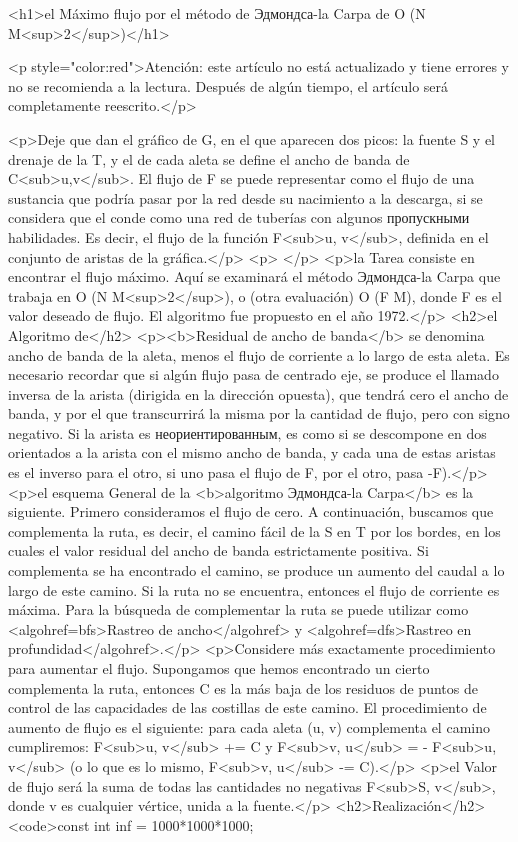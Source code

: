 <h1>el Máximo flujo por el método de Эдмондса-la Carpa de O (N M<sup>2</sup>)</h1>

<p style="color:red">Atención: este artículo no está actualizado y tiene errores y no se recomienda a la lectura. Después de algún tiempo, el artículo será completamente reescrito.</p>

<p>Deje que dan el gráfico de G, en el que aparecen dos picos: la fuente S y el drenaje de la T, y el de cada aleta se define el ancho de banda de C<sub>u,v</sub>. El flujo de F se puede representar como el flujo de una sustancia que podría pasar por la red desde su nacimiento a la descarga, si se considera que el conde como una red de tuberías con algunos пропускными habilidades. Es decir, el flujo de la función F<sub>u, v</sub>, definida en el conjunto de aristas de la gráfica.</p>
<p> </p>
<p>la Tarea consiste en encontrar el flujo máximo. Aquí se examinará el método Эдмондса-la Carpa que trabaja en O (N M<sup>2</sup>), o (otra evaluación) O (F M), donde F es el valor deseado de flujo. El algoritmo fue propuesto en el año 1972.</p>
<h2>el Algoritmo de</h2>
<p><b>Residual de ancho de banda</b> se denomina ancho de banda de la aleta, menos el flujo de corriente a lo largo de esta aleta. Es necesario recordar que si algún flujo pasa de centrado eje, se produce el llamado inversa de la arista (dirigida en la dirección opuesta), que tendrá cero el ancho de banda, y por el que transcurrirá la misma por la cantidad de flujo, pero con signo negativo. Si la arista es неориентированным, es como si se descompone en dos orientados a la arista con el mismo ancho de banda, y cada una de estas aristas es el inverso para el otro, si uno pasa el flujo de F, por el otro, pasa -F).</p>
<p>el esquema General de la <b>algoritmo Эдмондса-la Carpa</b> es la siguiente. Primero consideramos el flujo de cero. A continuación, buscamos que complementa la ruta, es decir, el camino fácil de la S en T por los bordes, en los cuales el valor residual del ancho de banda estrictamente positiva. Si complementa se ha encontrado el camino, se produce un aumento del caudal a lo largo de este camino. Si la ruta no se encuentra, entonces el flujo de corriente es máxima. Para la búsqueda de complementar la ruta se puede utilizar como <algohref=bfs>Rastreo de ancho</algohref> y <algohref=dfs>Rastreo en profundidad</algohref>.</p>
<p>Considere más exactamente procedimiento para aumentar el flujo. Supongamos que hemos encontrado un cierto complementa la ruta, entonces C es la más baja de los residuos de puntos de control de las capacidades de las costillas de este camino. El procedimiento de aumento de flujo es el siguiente: para cada aleta (u, v) complementa el camino cumpliremos: F<sub>u, v</sub> += C y F<sub>v, u</sub> = - F<sub>u, v</sub> (o lo que es lo mismo, F<sub>v, u</sub> -= C).</p>
<p>el Valor de flujo será la suma de todas las cantidades no negativas F<sub>S, v</sub>, donde v es cualquier vértice, unida a la fuente.</p>
<h2>Realización</h2>
<code>const int inf = 1000*1000*1000;


